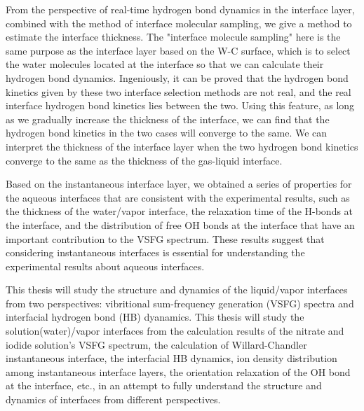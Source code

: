 From the perspective of real-time hydrogen bond dynamics in the interface layer, combined with the method of interface molecular sampling, we give a method to estimate the interface thickness. The "interface molecule sampling" here is the same purpose as the interface layer based on the W-C surface, which is to select the water molecules located at the interface so that we can calculate their hydrogen bond dynamics. Ingeniously, it can be proved that the hydrogen bond kinetics given by these two interface selection methods are not real, and the real interface hydrogen bond kinetics lies between the two. Using this feature, as long as we gradually increase the thickness of the interface, we can find that the hydrogen bond kinetics in the two cases will converge to the same. We can interpret the thickness of the interface layer when the two hydrogen bond kinetics converge to the same as the thickness of the gas-liquid interface.
 
Based on the instantaneous interface layer, we obtained a series of properties for the aqueous interfaces that are consistent with the experimental results, 
such as the thickness of the water/vapor interface, the relaxation time of the H-bonds at the interface, 
and the distribution of free OH bonds at the interface that have an important contribution to the VSFG spectrum.
These results suggest that considering instantaneous interfaces is essential for understanding the experimental results about aqueous interfaces.

This thesis will study the structure and dynamics of the liquid/vapor interfaces from two perspectives: 
vibritional sum-frequency generation (VSFG) spectra and interfacial hydrogen bond (HB) dyanamics.
This thesis will study the solution(water)/vapor interfaces from the calculation results of the nitrate and iodide solution's VSFG spectrum,
the calculation of Willard-Chandler instantaneous interface, 
the interfacial HB dynamics, ion density distribution among instantaneous interface layers, the orientation relaxation of the OH bond at the interface, etc., 
in an attempt to fully understand the structure and dynamics of interfaces from different perspectives. 

